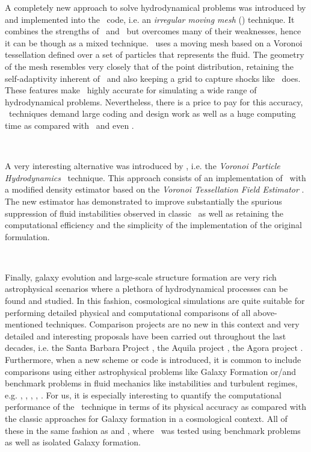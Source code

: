 \documentclass[a4,useAMS,usenatbib,usegraphicx,12pt]{article}
\begin{document}
A completely new approach to solve hydrodynamical problems was introduced by 
\citet{Springel10} and implemented into the \AREPO\ code, i.e. an \textit{
irregular moving mesh} (\IMM) technique. It combines the strengths of \AMR\ and 
\SPH\ but overcomes many of their weaknesses, hence it can be though as a mixed 
technique. \AREPO\ uses a moving mesh based on a Voronoi tessellation defined 
over a set of particles that represents the fluid. The geometry of the mesh 
resembles very closely that of the point distribution, retaining the 
self-adaptivity inherent of \SPH\ and also keeping a grid to capture shocks 
like \AMR\ does. These features make \AREPO\ highly accurate for simulating a 
wide range of hydrodynamical problems. Nevertheless, there is a price to pay 
for this accuracy, \IMM\ techniques demand large coding and design work as well
as a huge computing time as compared with \SPH\ and even \AMR.

\

A very interesting alternative was introduced by \citet{Hess10}, i.e. the 
\textit{Voronoi Particle Hydrodynamics} \VPH\ technique. This approach consists
of an implementation of \SPH\ with a modified density estimator based on the  
\textit{Voronoi Tessellation Field Estimator} \VTFE. The new estimator
has demonstrated to improve substantially the spurious suppression of fluid 
instabilities observed in classic \SPH\ as well as retaining the computational 
efficiency and the simplicity of the implementation of the original formulation.

\

Finally, galaxy evolution and large-scale structure formation are very rich 
astrophysical scenarios where a plethora of hydrodynamical processes can be 
found and studied. In this fashion, cosmological simulations are quite suitable 
for performing detailed physical and computational comparisons of all 
above-mentioned techniques. Comparison projects are no new in this context 
and very detailed and interesting proposals have been carried out throughout
the last decades, i.e. the Santa Barbara Project \citep{Frenk99}, the Aquila
project \citep{Scannapieco12}, the Agora project \citep{Kim14}. Furthermore,
when a new scheme or code is introduced, it is common to include comparisons 
using either astrophysical problems like Galaxy Formation or/and benchmark 
problems in fluid mechanics like instabilities and turbulent regimes, e.g.
\citep{Berger89}, \citep{Teyssier02}, \citep{Springel05}, \citep{Springel10}, 
\citep{Hess10}. For us, it is especially interesting to quantify the 
computational performance of the \VPH\ technique in terms of its physical 
accuracy as compared with the classic approaches for Galaxy formation in a
cosmological context. All of these in the same fashion as \citet{Hess10} and 
\citet{Hess12}, where \VPH\ was tested using benchmark problems as well as
isolated Galaxy formation.
\end{document}
